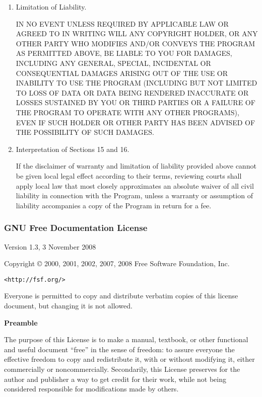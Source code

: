 \documentclass{article}
\begin{document}
\begin{enumerate}
\item Limitation of Liability.

 IN NO EVENT UNLESS REQUIRED BY APPLICABLE LAW OR AGREED TO IN
 WRITING WILL ANY COPYRIGHT HOLDER, OR ANY OTHER PARTY WHO MODIFIES
 AND/OR CONVEYS THE PROGRAM AS PERMITTED ABOVE, BE LIABLE TO YOU FOR
 DAMAGES, INCLUDING ANY GENERAL, SPECIAL, INCIDENTAL OR CONSEQUENTIAL
 DAMAGES ARISING OUT OF THE USE OR INABILITY TO USE THE PROGRAM
 (INCLUDING BUT NOT LIMITED TO LOSS OF DATA OR DATA BEING RENDERED
 INACCURATE OR LOSSES SUSTAINED BY YOU OR THIRD PARTIES OR A FAILURE
 OF THE PROGRAM TO OPERATE WITH ANY OTHER PROGRAMS), EVEN IF SUCH
 HOLDER OR OTHER PARTY HAS BEEN ADVISED OF THE POSSIBILITY OF SUCH
 DAMAGES.

\item Interpretation of Sections 15 and 16.

If the disclaimer of warranty and limitation of liability provided
above cannot be given local legal effect according to their terms,
reviewing courts shall apply local law that most closely approximates
an absolute waiver of all civil liability in connection with the
Program, unless a warranty or assumption of liability accompanies a
copy of the Program in return for a fee.

\end{enumerate}


\subsubsection{GNU Free Documentation License}
\label{subsubsec:fdl}

 \begin{center}

       Version 1.3, 3 November 2008


 Copyright \copyright{} 2000, 2001, 2002, 2007, 2008  Free Software Foundation, Inc.
 
 \bigskip
 
     \texttt{<http://fsf.org/>}
  
 \bigskip
 
 Everyone is permitted to copy and distribute verbatim copies
 of this license document, but changing it is not allowed.
\end{center}


\begin{center}
{\bf\large Preamble}
\end{center}

The purpose of this License is to make a manual, textbook, or other
functional and useful document ``free'' in the sense of freedom: to
assure everyone the effective freedom to copy and redistribute it,
with or without modifying it, either commercially or noncommercially.
Secondarily, this License preserves for the author and publisher a way
to get credit for their work, while not being considered responsible
for modifications made by others.
\end{document}
